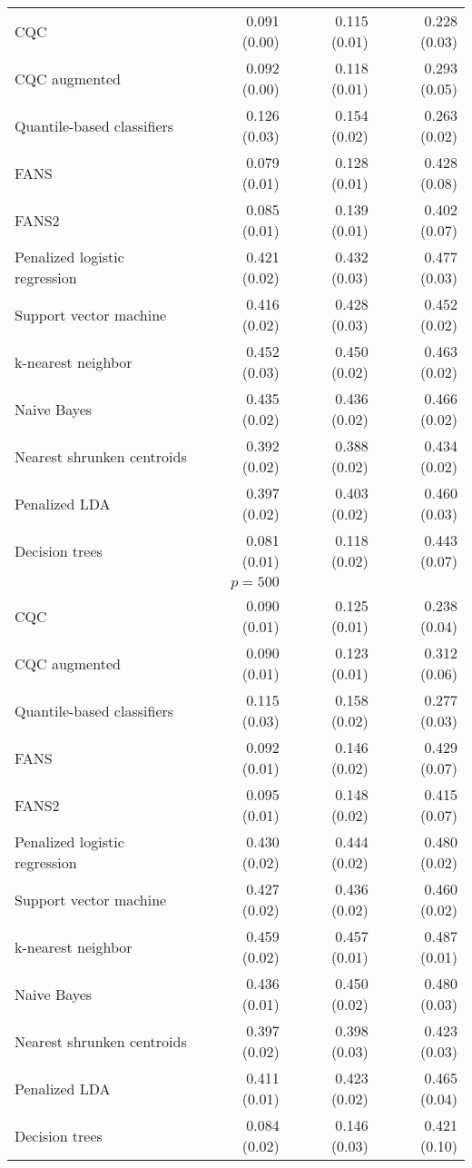 \begin{table}[p]
\begin{adjustbox}{max size={\textwidth}{10cm}}
\begin{tabular}{l@{\extracolsep{15mm}}rrr}
      CQC & 0.091 (0.00) & 0.115 (0.01) & 0.228 (0.03) \\ 
      CQC augmented & 0.092 (0.00) & 0.118 (0.01) & 0.293 (0.05) \\ 
      Quantile-based classifiers & 0.126 (0.03) & 0.154 (0.02) & 0.263 (0.02) \\ 
      FANS  & 0.079 (0.01) & 0.128 (0.01) & 0.428 (0.08) \\
      FANS2 & 0.085 (0.01) & 0.139 (0.01) & 0.402 (0.07) \\
      Penalized logistic regression & 0.421 (0.02) & 0.432 (0.03) & 0.477 (0.03) \\ 
      Support vector machine & 0.416 (0.02) & 0.428 (0.03) & 0.452 (0.02) \\ 
      k-nearest neighbor & 0.452 (0.03) & 0.450 (0.02) & 0.463 (0.02) \\ 
      Naive Bayes & 0.435 (0.02) & 0.436 (0.02) & 0.466 (0.02) \\ 
      Nearest shrunken centroids & 0.392 (0.02) & 0.388 (0.02) & 0.434 (0.02) \\ 
      Penalized LDA & 0.397 (0.02) & 0.403 (0.02) & 0.460 (0.03) \\ 
      Decision trees & 0.081 (0.01) & 0.118 (0.02) & 0.443 (0.07) \\ [2ex]

      \hline
      & $p = 500$ \\
      \hline

      CQC & 0.090 (0.01) & 0.125 (0.01) & 0.238 (0.04) \\ 
      CQC augmented & 0.090 (0.01) & 0.123 (0.01) & 0.312 (0.06) \\ 
      Quantile-based classifiers & 0.115 (0.03) & 0.158 (0.02) & 0.277 (0.03) \\ 
      FANS  & 0.092 (0.01) & 0.146 (0.02) & 0.429 (0.07) \\
      FANS2 & 0.095 (0.01) & 0.148 (0.02) & 0.415 (0.07) \\
      Penalized logistic regression & 0.430 (0.02) & 0.444 (0.02) & 0.480 (0.02) \\ 
      Support vector machine & 0.427 (0.02) & 0.436 (0.02) & 0.460 (0.02) \\ 
      k-nearest neighbor & 0.459 (0.02) & 0.457 (0.01) & 0.487 (0.01) \\ 
      Naive Bayes & 0.436 (0.01) & 0.450 (0.02) & 0.480 (0.03) \\ 
      Nearest shrunken centroids & 0.397 (0.02) & 0.398 (0.03) & 0.423 (0.03) \\ 
      Penalized LDA & 0.411 (0.01) & 0.423 (0.02) & 0.465 (0.04) \\ 
      Decision trees & 0.084 (0.02) & 0.146 (0.03) & 0.421 (0.10) \\ 

      \hline
      
    \end{tabular}
  \end{adjustbox}
\end{table}





